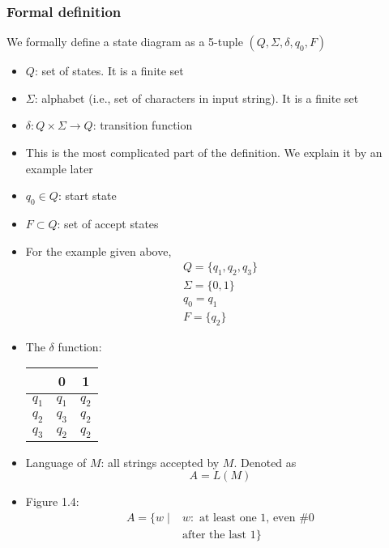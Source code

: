 \begin{frame}[allowframebreaks] \frametitle{Formal definition}
We formally define a state diagram as a 5-tuple $(Q,\Sigma, \delta, q_0, F)$
  \begin{itemize}

\item $Q$: set of states. It is a \alert{finite} set
\item $\Sigma$: alphabet (i.e., set of characters in input string). It is a finite set
\item $\delta: Q \times \Sigma \rightarrow Q$: transition function
\item [] This is the most complicated part of the definition. We explain it by an example
  later
\item $q_0 \in Q$: start state
\item $F \subset Q$: set of accept states

\item For the example given above,
\begin{gather*}
  Q=\{q_1,q_2, q_3\}\\
\Sigma=\{0,1\}\\
q_0 = q_1 \\
F=\{q_2\}
\end{gather*}
\item The $\delta$ function:
  \begin{center}
  \begin{tabular}{c|cc}
& 0 & 1\\ \hline
$q_1$ & $q_1$ & $q_2$\\
$q_2$ & $q_3$ & $q_2$\\
$q_3$ & $q_2$ & $q_2$
  \end{tabular}
\end{center}
\item Language of $M$: all strings accepted by $M$. 
Denoted as
\begin{equation*}
A=L(M)
\end{equation*}
\item Figure 1.4:
  \begin{equation*}
    \begin{split}
    A=\{
w \mid & w: \text{ at least one 1, even \# 0} \\
& \text{after the last 1}\}
\end{split}
  \end{equation*}
\end{itemize}
\end{frame}

